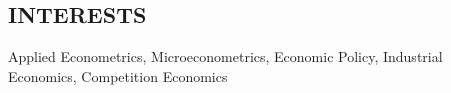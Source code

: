 \documentclass[margin]{res}
\begin{document}
\begin{resume}
\section{INTERESTS}
Applied Econometrics, Microeconometrics, Economic Policy, Industrial Economics, Competition Economics



\end{resume}
\end{document}

